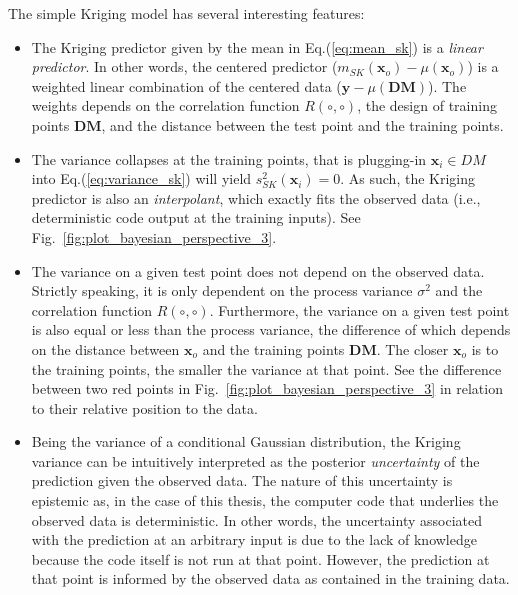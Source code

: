 The simple Kriging model has several interesting features:
\begin{itemize}
	\item The Kriging predictor given by the mean in Eq.(\ref{eq:mean_sk}) is a \emph{linear predictor}. 
	      In other words, the centered predictor ($m_{SK}(\mathbf{x}_o) - \mu (\mathbf{x}_o)$)  is a weighted linear combination of the centered data 
	      ($\mathbf{y} - \mu(\mathbf{DM})$).
				The weights depends on the correlation function $R(\circ,\circ)$, the design of training points $\mathbf{DM}$, and the distance between the test point and the training points.
	\item The variance collapses at the training points, that is plugging-in $\mathbf{x}_i \in DM$ into Eq.(\ref{eq:variance_sk}) will yield $s^2_{SK}(\mathbf{x}_i) = 0$.
	      As such, the Kriging predictor is also an \emph{interpolant}, which exactly fits the observed data (i.e., deterministic code output at the training inputs).
				See Fig.~\ref{fig:plot_bayesian_perspective_3}.
	\item The variance on a given test point does not depend on the observed data.
	      Strictly speaking, it is only dependent on the process variance $\sigma^2$ and the correlation function $R(\circ,\circ)$.
				Furthermore, the variance on a given test point is also equal or less than the process variance, 
				the difference of which depends on the distance between $\mathbf{x}_o$ and the training points $\mathbf{DM}$.
				The closer $\mathbf{x}_o$ is to the training points, the smaller the variance at that point.
				See the difference between two red points in Fig.~\ref{fig:plot_bayesian_perspective_3} in relation to their relative position to the data.
	\item Being the variance of a conditional Gaussian distribution, the Kriging variance can be intuitively interpreted as the posterior \emph{uncertainty} of the prediction given the observed data.
	      The nature of this uncertainty is epistemic as, in the case of this thesis, the computer code that underlies the observed data is deterministic.
				In other words, the uncertainty associated with the prediction at an arbitrary input is due to the lack of knowledge because the code itself is not run at that point.
				However, the prediction at that point is informed by the observed data as contained in the training data.
\end{itemize}

